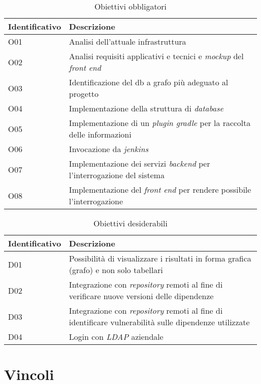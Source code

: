 \begin{table}[!h]
  \caption{Obiettivi obbligatori}
  \label{tab:obiettivi-obbligatori}
\begin{tabularx}{\textwidth}{lX}
   \textbf{Identificativo}&\textbf{Descrizione}\\ 
    \hline O01&Analisi dell'attuale infrastruttura\\
    \hline O02&Analisi requisiti applicativi e tecnici e \textit{mockup} del \textit{front end}\\
    \hline O03&Identificazione del db a grafo più adeguato al progetto\\
    \hline O04&Implementazione della struttura di \textit{database}\\
    \hline O05&Implementazione di un \textit{plugin gradle} per la raccolta delle informazioni\\
    \hline O06&Invocazione da \textit{jenkins}\\
    \hline O07&Implementazione dei servizi \textit{backend} per l'interrogazione del sistema\\
    \hline O08&Implementazione del \textit{front end} per rendere possibile l'interrogazione\\
    \hline 
\end{tabularx}
\end{table}

  \begin{table}[!h]
    \caption{Obiettivi desiderabili}
    \label{tab:obiettivi-desiderabili}
    \begin{tabularx}{\textwidth}{lX}
    \textbf{Identificativo}&\textbf{Descrizione}\\ 
    \hline D01&Possibilità di visualizzare i risultati in forma grafica (grafo) e non solo tabellari\\
    \hline D02&Integrazione con \textit{repository} remoti al fine di verificare nuove versioni delle dipendenze\\
    \hline D03&Integrazione con \textit{repository} remoti al fine di identificare vulnerabilità sulle dipendenze utilizzate\\
    \hline D04&Login con \textit{LDAP} aziendale\\  
    \hline
  \end{tabularx}
  \end{table}



  \section{Vincoli}
